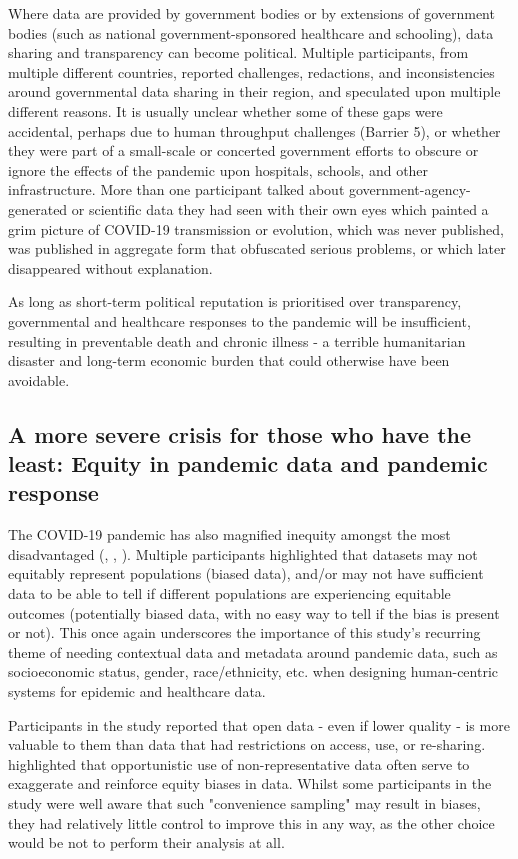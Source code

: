 \documentclass{CUP-JNL-DAP}%
\begin{document}
Where data are provided by government bodies or by extensions of government bodies (such as national government-sponsored healthcare and schooling), data sharing and transparency can become political. Multiple participants, from multiple different countries, reported challenges, redactions, and inconsistencies around governmental data sharing in their region, and speculated upon multiple different reasons. It is usually unclear whether some of these gaps were accidental, perhaps due to human throughput challenges (Barrier 5), or whether they were part of a small-scale or concerted government efforts to obscure or ignore the effects of the pandemic upon hospitals, schools, and other infrastructure. More than one participant talked about government-agency-generated or scientific data they had seen with their own eyes which painted a grim picture of COVID-19 transmission or evolution, which was never published, was published in aggregate form that obfuscated serious problems, or which later disappeared without explanation. 

As long as short-term political reputation is prioritised over transparency, governmental and healthcare responses to the pandemic will be insufficient, resulting in preventable death and chronic illness - a terrible humanitarian disaster and long-term economic burden that could otherwise have been avoidable.

\subsection{A more severe crisis for those who have the least: Equity in pandemic data and pandemic response}

The COVID-19 pandemic has also magnified inequity amongst the most disadvantaged (\cite{alon_gender_inequality_2020}, \cite{pilecco_racial_inequality_2020}, \cite{dron_data_2022} ). Multiple participants highlighted that datasets may not equitably represent populations (biased data), and/or may not have sufficient data to be able to tell if different populations are experiencing equitable outcomes (potentially biased data, with no easy way to tell if the bias is present or not). This once again underscores the importance of this study's recurring theme of needing contextual data and metadata around pandemic data, such as socioeconomic status, gender, race/ethnicity, etc. when designing human-centric systems for epidemic and healthcare data. 

Participants in the study reported that open data - even if lower quality - is more valuable to them than data that had restrictions on access, use, or re-sharing. \cite{chen_ethical_ml_2021} highlighted that opportunistic use of non-representative data often serve to exaggerate and reinforce equity biases in data. Whilst some participants in the study were well aware that such "convenience sampling" may result in biases, they had relatively little control to improve this in any way, as the other choice would be not to perform their analysis at all. 
\end{document}
